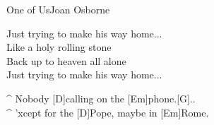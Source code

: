\begin{song}{One of Us}{Joan Osborne}


\begin{guitar}
Just trying to make his way home...\\
Like a holy rolling stone\\
Back up to heaven all alone\\
Just trying to make his way home...\\
\end{guitar}

\begin{guitar}
^ Nobody [D]calling on the [Em]phone.[G]..\\
^ 'xcept for the [D]Pope, maybe in [Em]Rome.\\
\end{guitar}
\end{song}
